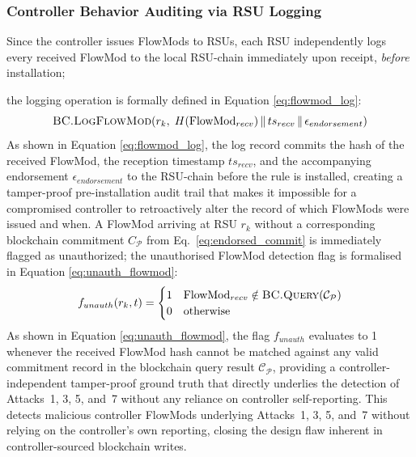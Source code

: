 \documentclass[12pt, a4paper]{report}
\begin{document}
\subsubsection{Controller Behavior Auditing via RSU Logging}
Since the controller issues FlowMods to RSUs, each RSU independently
logs every received FlowMod to the local RSU-chain immediately upon
receipt, \emph{before} installation;
{the logging operation is formally defined in
Equation \eqref{eq:flowmod_log}:
\begin{equation}
\textsc{BC.LogFlowMod}\!\left(r_k,\;
H(\text{FlowMod}_{recv}) \,\|\, ts_{recv} \,\|\,
\epsilon_{endorsement}\right)
\label{eq:flowmod_log}
\end{equation}
As shown in Equation \eqref{eq:flowmod_log}, the log record
commits the hash of the received FlowMod, the reception timestamp
$ts_{recv}$, and the accompanying endorsement $\epsilon_{endorsement}$
to the RSU-chain before the rule is installed, creating a
tamper-proof pre-installation audit trail that makes it impossible
for a compromised controller to retroactively alter the record of
which FlowMods were issued and when.
A FlowMod arriving at RSU $r_k$ without a corresponding blockchain
commitment $C_{\mathcal{P}}$ from Eq.~\eqref{eq:endorsed_commit}
is immediately flagged as unauthorized;
the unauthorised FlowMod detection flag is formalised in
Equation \eqref{eq:unauth_flowmod}:
\begin{equation}
f_{unauth}(r_k, t) =
\begin{cases}
1 & \text{FlowMod}_{recv} \notin
    \textsc{BC.Query}(\mathcal{C}_{\mathcal{P}}) \\
0 & \text{otherwise}
\end{cases}
\label{eq:unauth_flowmod}
\end{equation}
As shown in Equation \eqref{eq:unauth_flowmod}{, the flag
$f_{unauth}$ evaluates to 1 whenever the received FlowMod hash
cannot be matched against any valid commitment record in the
blockchain query result $\mathcal{C}_{\mathcal{P}}$, providing a
controller-independent tamper-proof ground truth that directly
underlies the detection of Attacks~1, 3, 5, and~7 without any
reliance on controller self-reporting.}
This detects malicious controller FlowMods underlying Attacks~1,
3, 5, and~7 without relying on the controller's own reporting,
closing the design flaw inherent in controller-sourced blockchain
writes.

}
\end{document}

